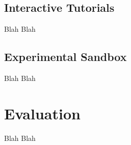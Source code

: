 \documentclass[bsc,twoside,singlespacing,parskip,logo]{infthesis}     %
\begin{document}
    \section{Interactive Tutorials}
	Blah Blah
    
    \section{Experimental Sandbox}
	Blah Blah


\chapter{Evaluation}
Blah Blah





\end{document}
